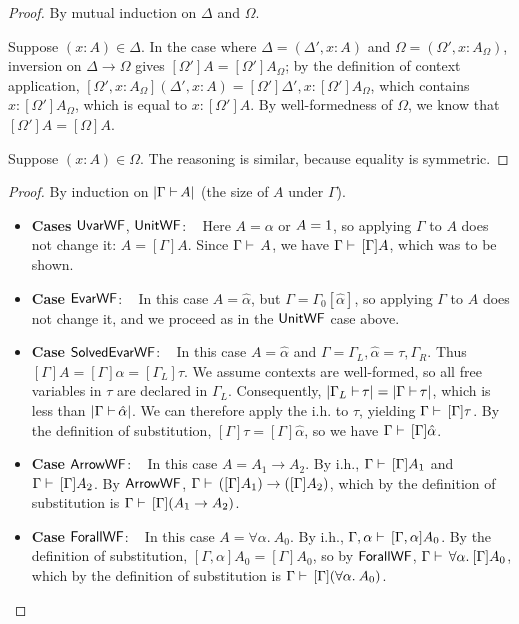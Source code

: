 \documentclass[a4paper]{article}
\newcommand{\arr}{\rightarrow}
\def\CompactJudgments{0}
\newcommand{\entails}{\mathrel{\ifnum\CompactJudgments=1\vdash \else \vdash\,\fi}}
\newcommand{\tyname}[1]{\textsf{\normalfont #1}}
\newcommand{\unitty}{\tyname{1}}
\newcommand{\ProofCaseRule}[1]{\item \textbf{Case }\textrm{{#1}}: ~ }
\newcommand{\ProofCasesRules}[1]{\item \textbf{Cases }\textrm{{#1}}: ~ }
\newcommand{\AllSym}{\forall}
\newcommand{\xAll}[1]{\AllSym#1}
\newcommand{\All}[1]{\xAll{#1}.\:}
\newcommand{\hypeq}[2]{{#1} = {#2}}
\newcommand{\alltype}[1]{\All{#1}}
\newcommand{\extendssym}{\longrightarrow}
\newcommand{\extends}[2]{{#1} \extendssym {#2}}
\newcommand{\substextend}[2]{\extends{#1}{#2}}
\newcommand{\judgetp}[2]{{#1} \entails {#2}}
\newcommand{\typesize}[2]{|{#1} {\;\entails} {#2}|}
\newcommand{\ahat}{\hat{\alpha}}
\newcommand{\rulename}[1]{\text{\normalfont\textsf{#1}}}
\newcommand{\WFrulename}[1]{\ensuremath{\rulename{{#1}WF}}\xspace}
\newcommand{\UvarWF}{\WFrulename{Uvar}}
\newcommand{\UnitWF}{\WFrulename{Unit}}
\newcommand{\EvarWF}{\WFrulename{Evar}}
\newcommand{\SolvedEvarWF}{\WFrulename{SolvedEvar}}
\newcommand{\ArrowWF}{\WFrulename{Arrow}}
\newcommand{\ForallWF}{\WFrulename{Forall}}
\begin{document}
\ctxappvarpreservation*
\begin{proof}  By mutual induction on $\Delta$ and $\Omega$.

  Suppose $(x : A) \in \Delta$.
  In the case where $\Delta = (\Delta', x : A)$ and $\Omega = (\Omega', x : A_\Omega)$,
  inversion on  $\substextend{\Delta}{\Omega}$ gives $[\Omega']A = [\Omega']A_\Omega$;
  by the definition of context application, $[\Omega', x : A_\Omega](\Delta', x : A) =
    [\Omega']\Delta', x : [\Omega']A_\Omega$, which contains $x : [\Omega']A_\Omega$,
    which is equal to $x : [\Omega']A$.  By well-formedness of $\Omega$, we know that
    $[\Omega']A = [\Omega]A$.

  Suppose $(x : A) \in \Omega$.  The reasoning is similar, because equality is symmetric.
\end{proof}

\substitutiontyping*
\begin{proof}
  By induction on $\typesize{\Gamma}{A}$ (the size of $A$ under $\Gamma$).
  
  \begin{itemize}
      \ProofCasesRules{\UvarWF, \UnitWF}
           Here $A = \alpha$ or $A = \unitty$, so applying $\Gamma$ to $A$ does not change it: $A = [\Gamma]A$.
           Since $\judgetp{\Gamma}{A}$, we have $\judgetp{\Gamma}{[\Gamma]A}$, which was to be shown.
      
      \ProofCaseRule{\EvarWF}
           In this case $A = \ahat$, but $\Gamma = \Gamma_0[\ahat]$, so applying $\Gamma$ to $A$ does not change it,
           and we proceed as in the \UnitWF case above.

      \ProofCaseRule{\SolvedEvarWF}
           In this case $A = \ahat$ and $\Gamma = \Gamma_L, \hypeq{\ahat}{\tau}, \Gamma_R$.
           Thus $[\Gamma]A = [\Gamma]\alpha = [\Gamma_L]\tau$.  We assume contexts are well-formed,
           so all free variables in $\tau$ are declared in $\Gamma_L$.  Consequently,
           $\typesize{\Gamma_L}{\tau} = \typesize{\Gamma}{\tau}$,
           which is less than $\typesize{\Gamma}{\ahat}$.  We can therefore apply the i.h. to $\tau$, yielding
           $\judgetp{\Gamma}{[\Gamma]\tau}$.  By the definition of substitution, $[\Gamma]\tau = [\Gamma]\ahat$,
           so we have $\judgetp{\Gamma}[\Gamma]\ahat$.

      \ProofCaseRule{\ArrowWF}
           In this case $A = A_1 \arr A_2$.
           By i.h., $\judgetp{\Gamma}{[\Gamma]A_1}$ and $\judgetp{\Gamma}{[\Gamma]A_2}$.
           By \ArrowWF, $\judgetp{\Gamma}{([\Gamma]A_1) \arr ([\Gamma]A_2)}$,
           which by the definition of substitution is
           $\judgetp{\Gamma}{[\Gamma](A_1 \arr A_2)}$.

      \ProofCaseRule{\ForallWF}
          In this case $A = \alltype{\alpha} A_0$.  By i.h., $\judgetp{\Gamma, \alpha}{[\Gamma, \alpha]A_0}$.
          By the definition of substitution, $[\Gamma, \alpha]A_0 = [\Gamma]A_0$,
          so by \ForallWF, $\judgetp{\Gamma}{\alltype{\alpha} [\Gamma]A_0}$,
          which by the definition of substitution is
          $\judgetp{\Gamma}{[\Gamma](\alltype{\alpha} A_0)}$.
  \qedhere
  \end{itemize}
\end{proof}
\end{document}
